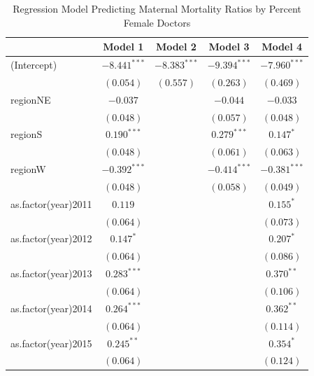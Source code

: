 \documentclass[11pt,]{article}
\begin{document}
\begin{table}
\caption{Regression Model Predicting Maternal Mortality Ratios by Percent Female Doctors}
\begin{center}
\begin{tabular}{l c c c c }
\hline
 & Model 1 & Model 2 & Model 3 & Model 4 \\
\hline
(Intercept)         & $-8.441^{***}$ & $-8.383^{***}$ & $-9.394^{***}$ & $-7.960^{***}$ \\
                    & $(0.054)$      & $(0.557)$      & $(0.263)$      & $(0.469)$      \\
regionNE            & $-0.037$       &                & $-0.044$       & $-0.033$       \\
                    & $(0.048)$      &                & $(0.057)$      & $(0.048)$      \\
regionS             & $0.190^{***}$  &                & $0.279^{***}$  & $0.147^{*}$    \\
                    & $(0.048)$      &                & $(0.061)$      & $(0.063)$      \\
regionW             & $-0.392^{***}$ &                & $-0.414^{***}$ & $-0.381^{***}$ \\
                    & $(0.048)$      &                & $(0.058)$      & $(0.049)$      \\
as.factor(year)2011 & $0.119$        &                &                & $0.155^{*}$    \\
                    & $(0.064)$      &                &                & $(0.073)$      \\
as.factor(year)2012 & $0.147^{*}$    &                &                & $0.207^{*}$    \\
                    & $(0.064)$      &                &                & $(0.086)$      \\
as.factor(year)2013 & $0.283^{***}$  &                &                & $0.370^{**}$   \\
                    & $(0.064)$      &                &                & $(0.106)$      \\
as.factor(year)2014 & $0.264^{***}$  &                &                & $0.362^{**}$   \\
                    & $(0.064)$      &                &                & $(0.114)$      \\
as.factor(year)2015 & $0.245^{**}$   &                &                & $0.354^{*}$    \\
                    & $(0.064)$      &                &                & $(0.124)$      \\

\end{tabular}
\end{center}
\end{table}
\end{document}
